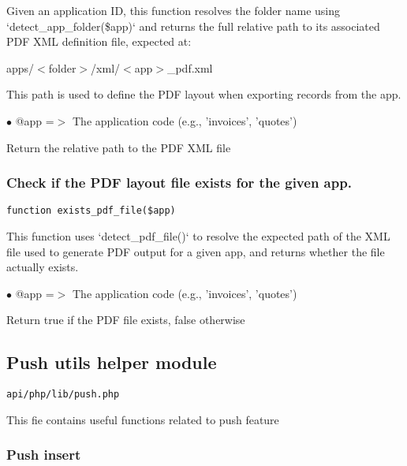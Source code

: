 \documentclass[a4paper]{article}
\begin{document}
Given an application ID, this function resolves the folder name
using `detect\_app\_folder(\$app)` and returns the full relative path
to its associated PDF XML definition file, expected at:

    apps/$<$folder$>$/xml/$<$app$>$\_pdf.xml

This path is used to define the PDF layout when exporting records
from the app.

\begin{compactitem}
\item[\color{myblue}$\bullet$] @app =$>$ The application code (e.g., 'invoices', 'quotes')
\end{compactitem}

Return the relative path to the PDF XML file

\hypertarget{toc517}{}
\subsubsection{Check if the PDF layout file exists for the given app.}

\begin{lstlisting}
function exists_pdf_file($app)
\end{lstlisting}

This function uses `detect\_pdf\_file()` to resolve the expected
path of the XML file used to generate PDF output for a given app,
and returns whether the file actually exists.

\begin{compactitem}
\item[\color{myblue}$\bullet$] @app =$>$ The application code (e.g., 'invoices', 'quotes')
\end{compactitem}

Return true if the PDF file exists, false otherwise

\hypertarget{toc518}{}
\subsection{Push utils helper module}

\begin{lstlisting}
api/php/lib/push.php
\end{lstlisting}

This fie contains useful functions related to push feature

\hypertarget{toc519}{}
\subsubsection{Push insert}
\end{document}
